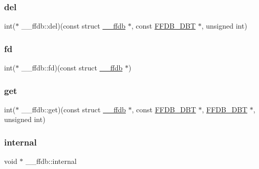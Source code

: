 \subsubsection{\texorpdfstring{del}{del}}
{\footnotesize\ttfamily int($\ast$ \+\_\+\+\_\+ffdb\+::del)(const struct \mbox{\hyperlink{struct____ffdb}{\+\_\+\+\_\+ffdb}} $\ast$, const \mbox{\hyperlink{adat-devel_2other__libs_2filedb_2filehash_2ffdb__db_8h_aa2e0984399491df0fdd20898ca8758f9}{F\+F\+D\+B\+\_\+\+D\+BT}} $\ast$, unsigned int)}

\mbox{\label{struct____ffdb_a24c4b1701425fc71436f66031f40f784}} 
\subsubsection{\texorpdfstring{fd}{fd}}
{\footnotesize\ttfamily int($\ast$ \+\_\+\+\_\+ffdb\+::fd)(const struct \mbox{\hyperlink{struct____ffdb}{\+\_\+\+\_\+ffdb}} $\ast$)}

\mbox{\label{struct____ffdb_a8a7764381b955beff42d80df7d895f15}} 
\subsubsection{\texorpdfstring{get}{get}}
{\footnotesize\ttfamily int($\ast$ \+\_\+\+\_\+ffdb\+::get)(const struct \mbox{\hyperlink{struct____ffdb}{\+\_\+\+\_\+ffdb}} $\ast$, const \mbox{\hyperlink{adat-devel_2other__libs_2filedb_2filehash_2ffdb__db_8h_aa2e0984399491df0fdd20898ca8758f9}{F\+F\+D\+B\+\_\+\+D\+BT}} $\ast$, \mbox{\hyperlink{adat-devel_2other__libs_2filedb_2filehash_2ffdb__db_8h_aa2e0984399491df0fdd20898ca8758f9}{F\+F\+D\+B\+\_\+\+D\+BT}} $\ast$, unsigned int)}

\mbox{\label{struct____ffdb_af883642213f91052caf45c51b25dd69d}} 
\subsubsection{\texorpdfstring{internal}{internal}}
{\footnotesize\ttfamily void $\ast$ \+\_\+\+\_\+ffdb\+::internal}

\mbox{\label{struct____ffdb_a63b3f6dcb802e3ed86921fd618eeee52}} 
